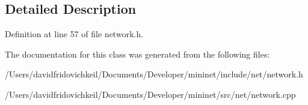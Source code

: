 \subsection{Detailed Description}


Definition at line 57 of file network.\+h.



The documentation for this class was generated from the following files\+:\begin{DoxyCompactItemize}
\item 
/\+Users/davidfridovichkeil/\+Documents/\+Developer/mininet/include/net/network.\+h\item 
/\+Users/davidfridovichkeil/\+Documents/\+Developer/mininet/src/net/network.\+cpp\end{DoxyCompactItemize}
